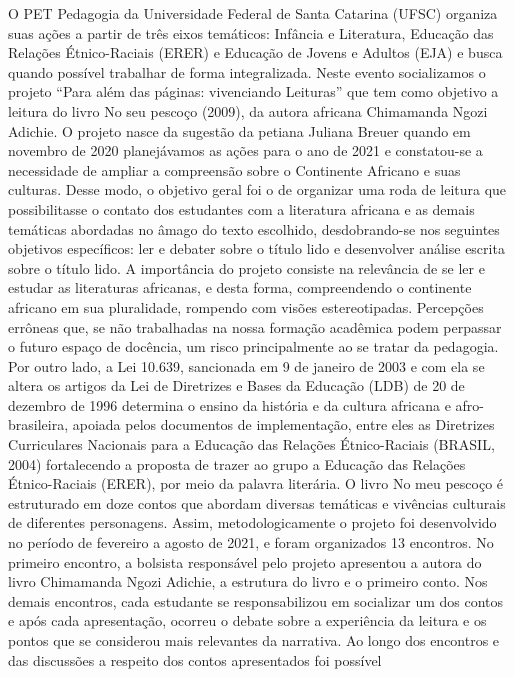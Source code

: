 O PET Pedagogia da Universidade Federal de Santa Catarina (UFSC) organiza suas ações 
a partir de três eixos temáticos: Infância e Literatura, Educação das Relações Étnico-Raciais 
(ERER) e Educação de Jovens e Adultos (EJA) e busca quando possível trabalhar de forma 
integralizada. Neste evento socializamos o projeto “Para além das páginas: vivenciando Leituras” 
que tem como objetivo a leitura do livro No seu pescoço (2009), da autora africana Chimamanda 
Ngozi Adichie. O projeto nasce da sugestão da petiana Juliana Breuer quando em novembro de 
2020 planejávamos as ações para o ano de 2021 e constatou-se a necessidade de ampliar a 
compreensão sobre o Continente Africano e suas culturas. Desse modo, o objetivo geral foi o de 
organizar uma roda de leitura que possibilitasse o contato dos estudantes com a literatura africana 
e as demais temáticas abordadas no âmago do texto escolhido, desdobrando-se nos seguintes 
objetivos específicos: ler e debater sobre o título lido e desenvolver análise escrita sobre o título 
lido.
A importância do projeto consiste na relevância de se ler e estudar as literaturas africanas, 
e desta forma, compreendendo o continente africano em sua pluralidade, rompendo com visões 
estereotipadas. Percepções errôneas que, se não trabalhadas na nossa formação acadêmica podem 
perpassar o futuro espaço de docência, um risco principalmente ao se tratar da pedagogia. Por 
outro lado, a Lei 10.639, sancionada em 9 de janeiro de 2003 e com ela se altera os artigos da Lei 
de Diretrizes e Bases da Educação (LDB) de 20 de dezembro de 1996 determina o ensino da 
história e da cultura africana e afro-brasileira, apoiada pelos documentos de implementação, entre 
eles as Diretrizes Curriculares Nacionais para a Educação das Relações Étnico-Raciais (BRASIL, 
2004) fortalecendo a proposta de trazer ao grupo a Educação das Relações Étnico-Raciais (ERER), 
por meio da palavra literária.
O livro No meu pescoço é estruturado em doze contos que abordam diversas temáticas e 
vivências culturais de diferentes personagens. Assim, metodologicamente o projeto foi 
desenvolvido no período de fevereiro a agosto de 2021, e foram organizados 13 encontros. No 
primeiro encontro, a bolsista responsável pelo projeto apresentou a autora do livro Chimamanda 
Ngozi Adichie, a estrutura do livro e o primeiro conto. Nos demais encontros, cada estudante se 
responsabilizou em socializar um dos contos e após cada apresentação, ocorreu o debate sobre a 
experiência da leitura e os pontos que se considerou mais relevantes da narrativa. 
Ao longo dos encontros e das discussões a respeito dos contos apresentados foi possível 
